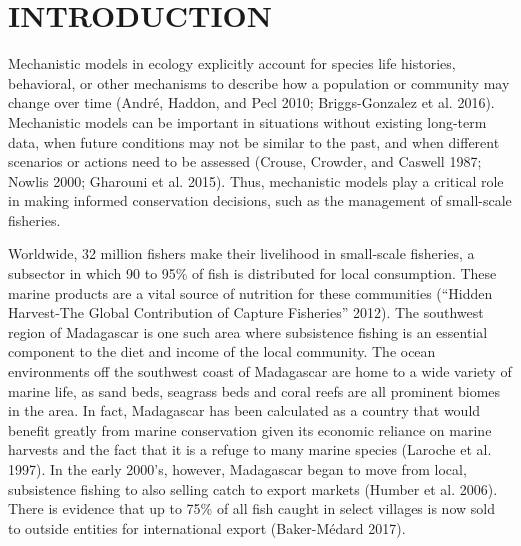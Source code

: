 \documentclass[
]{article}
\begin{document}
\hypertarget{introduction}{%
\section{INTRODUCTION}\label{introduction}}

Mechanistic models in ecology explicitly account for species life histories, behavioral, or other mechanisms to describe how a population or community may change over time (André, Haddon, and Pecl 2010; Briggs-Gonzalez et al. 2016). Mechanistic models can be important in situations without existing long-term data, when future conditions may not be similar to the past, and when different scenarios or actions need to be assessed (Crouse, Crowder, and Caswell 1987; Nowlis 2000; Gharouni et al. 2015). Thus, mechanistic models play a critical role in making informed conservation decisions, such as the management of small-scale fisheries.

Worldwide, 32 million fishers make their livelihood in small-scale fisheries, a subsector in which 90 to 95\% of fish is distributed for local consumption. These marine products are a vital source of nutrition for these communities ({``Hidden {Harvest}-{The} {Global} {Contribution} of {Capture} {Fisheries}''} 2012). The southwest region of Madagascar is one such area where subsistence fishing is an essential component to the diet and income of the local community. The ocean environments off the southwest coast of Madagascar are home to a wide variety of marine life, as sand beds, seagrass beds and coral reefs are all prominent biomes in the area. In fact, Madagascar has been calculated as a country that would benefit greatly from marine conservation given its economic reliance on marine harvests and the fact that it is a refuge to many marine species (Laroche et al. 1997). In the early 2000's, however, Madagascar began to move from local, subsistence fishing to also selling catch to export markets (Humber et al. 2006). There is evidence that up to 75\% of all fish caught in select villages is now sold to outside entities for international export (Baker-Médard 2017).
\end{document}

